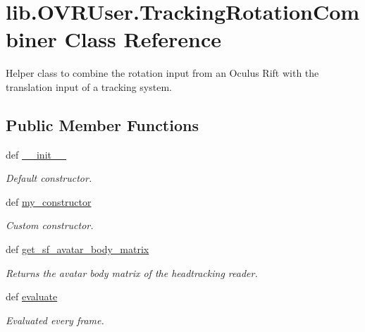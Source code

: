 \hypertarget{classlib_1_1OVRUser_1_1TrackingRotationCombiner}{\section{lib.\-O\-V\-R\-User.\-Tracking\-Rotation\-Combiner \-Class \-Reference}
\label{classlib_1_1OVRUser_1_1TrackingRotationCombiner}
}


\-Helper class to combine the rotation input from an \-Oculus \-Rift with the translation input of a tracking system.  


\subsection*{\-Public \-Member \-Functions}
\begin{DoxyCompactItemize}
\item 
def \hyperlink{classlib_1_1OVRUser_1_1TrackingRotationCombiner_aadfb3f4aa4dab4bd992646cacbc1fcab}{\-\_\-\-\_\-init\-\_\-\-\_\-}
\begin{DoxyCompactList}\small\item\em \-Default constructor. \end{DoxyCompactList}\item 
def \hyperlink{classlib_1_1OVRUser_1_1TrackingRotationCombiner_a759580d053cc6d8949167c6de6c8c97a}{my\-\_\-constructor}
\begin{DoxyCompactList}\small\item\em \-Custom constructor. \end{DoxyCompactList}\item 
def \hyperlink{classlib_1_1OVRUser_1_1TrackingRotationCombiner_ae5f2747b088db123edf4ffeb534ef705}{get\-\_\-sf\-\_\-avatar\-\_\-body\-\_\-matrix}
\begin{DoxyCompactList}\small\item\em \-Returns the avatar body matrix of the headtracking reader. \end{DoxyCompactList}\item 
def \hyperlink{classlib_1_1OVRUser_1_1TrackingRotationCombiner_a8cd5a4b8b090ff514c294e02fb6163c6}{evaluate}
\begin{DoxyCompactList}\small\item\em \-Evaluated every frame. \end{DoxyCompactList}\end{DoxyCompactItemize}
